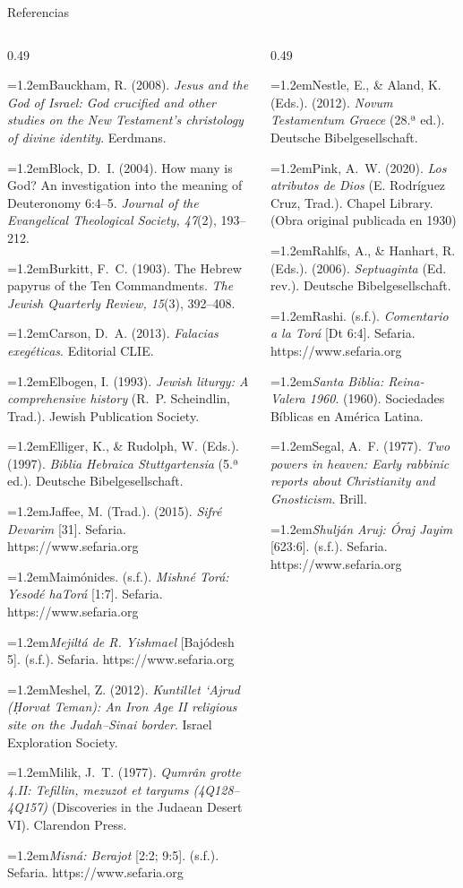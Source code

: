 \documentclass[hyperref={bookmarks=false},aspectratio=169]{beamer}
\newcommand{\refapa}[1]{\par{\RaggedRight\hangindent=1.2em\hangafter=1\noindent #1\par}\vspace{3pt}}
\begin{document}
\begin{frame}{Referencias}
\fontsize{5.0}{6.0}\selectfont
\begin{columns}[t,onlytextwidth]
\begin{column}{0.49\textwidth}
\refapa{Bauckham, R. (2008). \emph{Jesus and the God of Israel: God crucified and other studies on the New Testament's christology of divine identity}. Eerdmans.}
\refapa{Block, D.~I. (2004). How many is God? An investigation into the meaning of Deuteronomy 6:4--5. \emph{Journal of the Evangelical Theological Society, 47}(2), 193--212.}
\refapa{Burkitt, F.~C. (1903). The Hebrew papyrus of the Ten Commandments. \emph{The Jewish Quarterly Review, 15}(3), 392--408.}
\refapa{Carson, D.~A. (2013). \emph{Falacias exegéticas}. Editorial CLIE.}
\refapa{Elbogen, I. (1993). \emph{Jewish liturgy: A comprehensive history} (R.~P. Scheindlin, Trad.). Jewish Publication Society.}
\refapa{Elliger, K., \& Rudolph, W. (Eds.). (1997). \emph{Biblia Hebraica Stuttgartensia} (5.ª ed.). Deutsche Bibelgesellschaft.}
\refapa{Jaffee, M. (Trad.). (2015). \emph{Sifré Devarim} [31]. Sefaria. https://www.sefaria.org}
\refapa{Maimónides. (s.f.). \emph{Mishné Torá: Yesodé haTorá} [1:7]. Sefaria. https://www.sefaria.org}
\refapa{\emph{Mejiltá de R. Yishmael} [Bajódesh 5]. (s.f.). Sefaria. https://www.sefaria.org}
\refapa{Meshel, Z. (2012). \emph{Kuntillet `Ajrud (Ḥorvat Teman): An Iron Age II religious site on the Judah--Sinai border}. Israel Exploration Society.}
\refapa{Milik, J.~T. (1977). \emph{Qumrân grotte 4.II: Tefillin, mezuzot et targums (4Q128--4Q157)} (Discoveries in the Judaean Desert VI). Clarendon Press.}
\refapa{\emph{Misná: Berajot} [2:2; 9:5]. (s.f.). Sefaria. https://www.sefaria.org}
\end{column}
\begin{column}{0.49\textwidth}
\refapa{Nestle, E., \& Aland, K. (Eds.). (2012). \emph{Novum Testamentum Graece} (28.ª ed.). Deutsche Bibelgesellschaft.}
\refapa{Pink, A.~W. (2020). \emph{Los atributos de Dios} (E. Rodríguez Cruz, Trad.). Chapel Library. (Obra original publicada en 1930)}
\refapa{Rahlfs, A., \& Hanhart, R. (Eds.). (2006). \emph{Septuaginta} (Ed. rev.). Deutsche Bibelgesellschaft.}
\refapa{Rashi. (s.f.). \emph{Comentario a la Torá} [Dt 6:4]. Sefaria. https://www.sefaria.org}
\refapa{\emph{Santa Biblia: Reina-Valera 1960}. (1960). Sociedades Bíblicas en América Latina.}
\refapa{Segal, A.~F. (1977). \emph{Two powers in heaven: Early rabbinic reports about Christianity and Gnosticism}. Brill.}
\refapa{\emph{Shulján Aruj: Óraj Jayim} [623:6]. (s.f.). Sefaria. https://www.sefaria.org}

\end{column}
\end{columns}
\end{frame}
\end{document}
